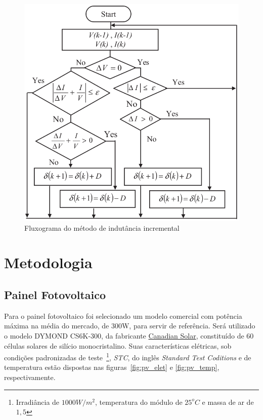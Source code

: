 \documentclass[
	12pt,				%
	openright,			%
	onseside,
	a4paper,			%
	english,			%
	french,				%
	spanish,			%
	brazil,				%
	]{abntex2}
\begin{document}
\begin{figure}[]
	\begin{center}
		\includegraphics[width=0.55 \linewidth]{incCond_flow}
		\caption{Fluxograma do método de indutância incremental \cite{Talha_MPPT}}
		\label{fig:IncCond_Flux}
	\end{center}
\end{figure}




\chapter{Metodologia}

\section{Painel Fotovoltaico}

Para o painel fotovoltaico foi selecionado um modelo comercial com potência máxima na média do mercado, de 300W, para servir de referência. Será utilizado o modelo DYMOND CS6K-300, da fabricante \href{https://www.canadiansolar.com/en}{Canadian Solar}, constituído de 60 células solares de silício monocristalino. Suas características elétricas, sob condições padronizadas de teste~\footnote{Irradiância de $1000W/m^2$, temperatura do módulo de $25^oC$ e massa de ar de $1,5$}, \emph{STC}, do inglês \textit{Standard Test Coditions} e de temperatura estão dispostas nas figuras~\ref{fig:pv_elet} e \ref{fig:pv_temp}, respectivamente.
\end{document}

